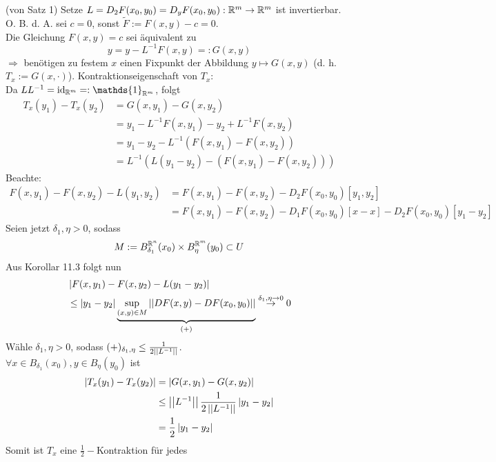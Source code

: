 \documentclass[../ana2.tex]{subfiles}
\begin{document}
\begin{bew}(von Satz 1)
    Setze \(L = D_2F(x_0, y_0) = D_yF(x_0,y_0):\mathbb{R}^m\rightarrow \mathbb{R}^m\) 
    ist invertierbar. O. B. d. A. sei \( c = 0 \), sonst 
    \( \tilde{F} := F(x,y) - c = 0 \).\\
    Die Gleichung \( F(x,y) = c \) sei äquivalent zu 
    \[ y = y - L^{-1}F(x,y) =: G(x,y) \]
    \(\Rightarrow\) benötigen zu festem \(x\) einen Fixpunkt
    der Abbildung \(y \mapsto G(x, y)\) (d. h. \( T_x := G(x, \cdot) \)).
    Kontraktionseigenschaft von \(T_x\):\\
    Da \(LL^{-1} = \id_{\R^m} =: \mathds{1}_{\R^m} \), folgt 
    \begin{align*}
        T_x(y_1)-T_x(y_2) &= G(x,y_1)-G(x,y_2) \\
        &= y_1 -L^{-1}F(x,y_1) -y_2+L^{-1}F(x,y_2) \\
        &= y_1 -y_2 - L^{-1}(F(x,y_1)-F(x,y_2)) \\
        &= L^{-1}(L(y_1-y_2)-(F(x,y_1)-F(x,y_2)))
    \end{align*}
    Beachte:
    \begin{align*}
        F(x,y_1)-F(x,y_2)-L(y_1,y_2) 
        &= F(x,y_1)-F(x,y_2) - D_2F(x_0,y_0)[y_1,y_2] \\
        &= F(x,y_1)-F(x,y_2) - D_1F(x_0,y_0)[x-x]
        -D_2F(x_0,y_0)[y_1-y_2]
    \end{align*}
    Seien jetzt \(\delta_1, \eta > 0\), sodass
    \[ M := B_{\delta_1}^{\mathbb{R}^n}(x_0) \times B_\eta^{\mathbb{R}^m}(y_0) \subset U \]
    Aus Korollar 11.3 folgt nun 
    \begin{align*}
        &\left| F(x,y_1) - F(x, y_2) - L(y_1 - y_2) \right| \\
        &\leq \left| y_1 - y_2 \right| \underbrace{\underset{(x,y) \in M}{\sup} 
        \left|\left|DF(x,y)-DF(x_0,y_0)\right|\right|}_{(+)}
        \overset{\delta_1, \eta \rightarrow 0}{\rightarrow} 0
    \end{align*}
    Wähle \( \delta_1, \eta > 0 \), sodass \( (+)_{\delta_1, \eta} 
    \leq \frac{1}{2 \left|\left|L^{-1}\right|\right|} \).\\
    \( \forall x \in B_{\delta_1}(x_0), y \in B_{\eta}(y_0) \) ist 
    \begin{align*}
        \left| T_x(y_1) - T_x(y_2) \right| &= \left| G(x,y_1) - G(x,y_2) \right| \\
        &\leq \left|\left|L^{-1}\right|\right| \frac{1}{2 \left|\left|L^{-1}\right|\right|} \left|y_1 - y_2\right| \\
        &= \frac{1}{2} \left|y_1-y_2\right|
    \end{align*}
    Somit ist \(T_x\) eine \(\frac{1}{2}-\)Kontraktion für jedes

\end{bew}
\end{document}
